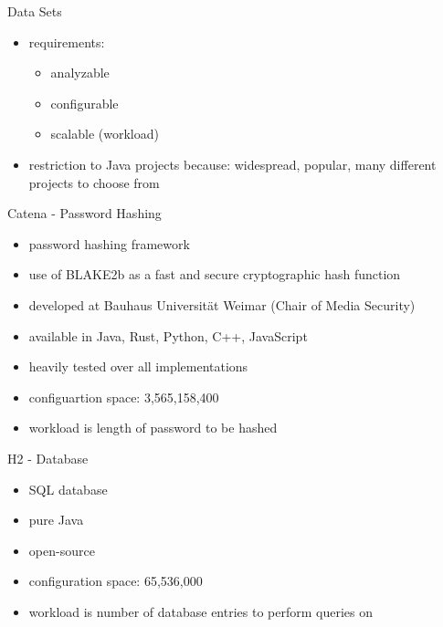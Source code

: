 \documentclass[11pt,aspectratio=169]{beamer}
\begin{document}

\begin{frame}{Data Sets}
  \begin{itemize}
    \item requirements:
    \begin{itemize}
      \item analyzable
      \item configurable
      \item scalable (workload)
    \end{itemize}
    \item restriction to Java projects because: widespread, popular, many different projects to choose from
  \end{itemize}
\end{frame}

\begin{frame}{Catena - Password Hashing}
  \begin{itemize}
    \item password hashing framework
    \item use of BLAKE2b as a fast and secure cryptographic hash function
    \item developed at Bauhaus Universität Weimar (Chair of Media Security)
    \pause
    \item available in Java, Rust, Python, C++, JavaScript
    \item heavily tested over all implementations
    \item configuartion space: 3,565,158,400
    \item workload is length of password to be hashed
  \end{itemize}
\end{frame}

\begin{frame}{H2 - Database}
  \begin{itemize}
    \item SQL database
    \item pure Java
    \item open-source
    \item configuration space: 65,536,000
    \item workload is number of database entries to perform queries on
  \end{itemize}
\end{frame}
\end{document}
